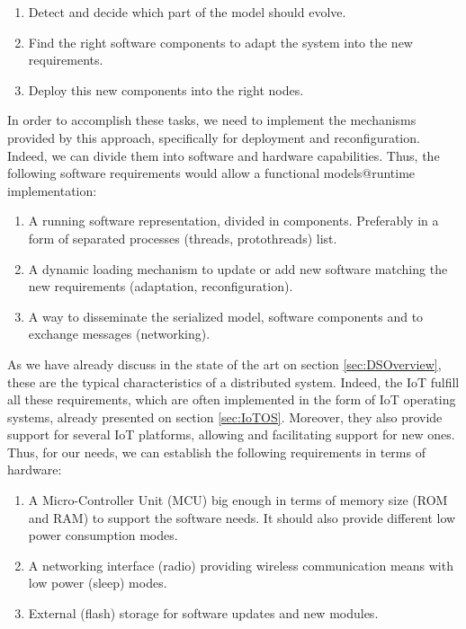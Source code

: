 \begin{enumerate}
	\item Detect and decide which part of the model should evolve.
	\item Find the right software components to adapt the system into the new requirements.
	\item Deploy this new components into the right nodes.
\end{enumerate}

In order to accomplish these tasks, we need to implement the mechanisms provided by this approach, specifically for deployment and reconfiguration.
Indeed, we can divide them into software and hardware capabilities.
Thus, the following software requirements would allow a functional models@runtime implementation:

\begin{enumerate}
	\item A running software representation, divided in components. Preferably in a form of separated processes (threads, protothreads) list.
	\item A dynamic loading mechanism to update or add new software matching the new requirements (adaptation, reconfiguration).
	\item A way to disseminate the serialized model, software components and to exchange messages (networking).
\end{enumerate}

As we have already discuss in the state of the art on section \ref{sec:DSOverview}, these are the typical characteristics of a distributed system. 
Indeed, the IoT fulfill all these requirements, which are often implemented in the form of IoT operating systems, already presented on section \ref{sec:IoTOS}.
Moreover, they also provide support for several IoT platforms, allowing and facilitating support for new ones.
Thus, for our needs, we can establish the following requirements in terms of hardware:

\begin{enumerate}
	\item A Micro-Controller Unit (MCU) big enough in terms of memory size (ROM and RAM) to support the software needs. It should also provide different low power consumption modes.
	\item A networking interface (radio) providing wireless communication means with low power (sleep) modes.
	\item External (flash) storage for software updates and new modules.
\end{enumerate} 

